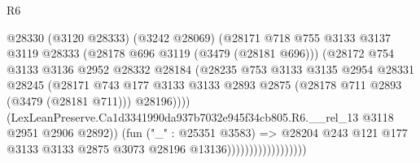 \begin{lexlean}{R6}
\begin{coremodule}
                                      @28330
                                        (@3120 @28333)
                                        (@3242 @28069)
                                        (@28171
                                          @718
                                          @755
                                          @3133
                                          @3137
                                          @3119
                                          @28333
                                          (@28178 @696 @3119 (@3479 (@28181 @696)))
                                          (@28172
                                            @754
                                            @3133
                                            @3136
                                            @2952
                                            @28332
                                            @28184
                                            (@28235
                                              @753
                                              @3133
                                              @3135
                                              @2954
                                              @28331
                                              @28245
                                              (@28171
                                                @743
                                                @177
                                                @3133
                                                @3133
                                                @2893
                                                @2875
                                                (@28178 @711 @2893 (@3479 (@28181 @711)))
                                                @28196))))
                                        (LexLeanPreserve.Ca1d3341990da937b7032e945f34cb805.R6.__rel_13
                                          @3118
                                          @2951
                                          @2906
                                          @2892))
                                      (fun ("_" : @25351 @3583) =>
                                      @28204
                                        @243
                                        @121
                                        @177
                                        @3133
                                        @3133
                                        @2875
                                        @3073
                                        @28196
                                        @13136))))))))))))))))))

\end{coremodule}
\end{lexlean}
